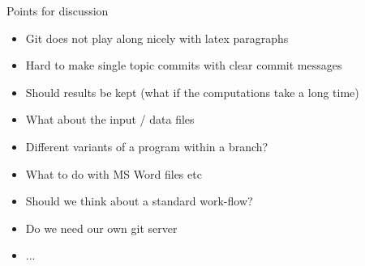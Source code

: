 \documentclass[12pt]{beamer}
\begin{document}
\begin{frame}{Points for discussion}
	\begin{itemize}
		\item Git does not play along nicely with latex paragraphs
		\item Hard to make single topic commits with clear commit messages
		\item Should results be kept (what if the computations take a long time)
		\item What about the input / data files
		\item Different variants of a program within a branch?
		\item What to do with MS Word files etc
		\item Should we think about a standard work-flow?
		\item Do we need our own git server
		\item ... 
	\end{itemize}	
\end{frame}	
\end{document}
